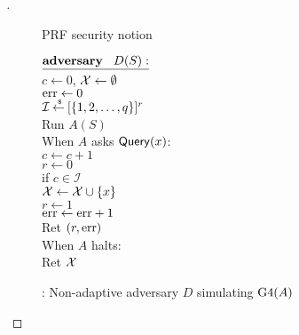 \begin{proof}[]
\begin{figure}
\centering
{}
\caption{PRF security notion}\label{fig:prf}
\end{figure}


\begin{figure}
\centering
{}
{
${\underline{\textbf{adversary}\hspace*{2ex} {D(S)}:}}$\\[4pt]
$c \gets 0$, ${\cal X} \gets \emptyset$\\
$\mathrm{err} \gets 0$\\
$\mathcal{I}{\:\stackrel{{\scriptscriptstyle \hspace{0.2em}\$}} {\leftarrow}\:} [\{1,2,\ldots,q\}]^r$\\
Run $A(S)$\\
When $A$ asks $\mathsf{Query}(x)$:\\
\nudge $c \gets c+1$\\
\nudge $r \gets 0$\\
\nudge if $c \in \mathcal{I}$\\
\nudge \nudge ${\cal X} \gets {\cal X} \cup \{x\}$\\
\nudge \nudge $r \gets 1$\\
\nudge \nudge $\mathrm{err} \gets \mathrm{err} + 1$\\
\nudge Ret $(r,\mathrm{err} )$\\
When $A$ halts:\\
\nudge Ret ${\cal X}$
}
\caption{: Non-adaptive adversary $D$ simulating $\text{G4}(A)$} \label{fig:D}
\end{figure}	

\end{proof}

